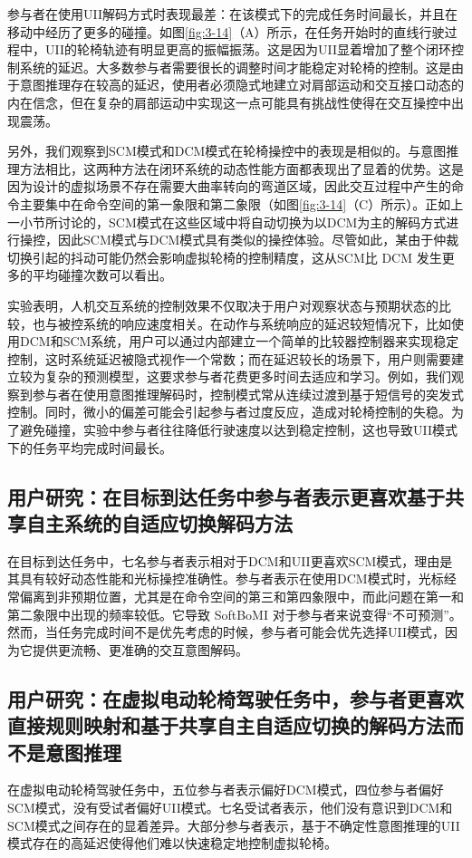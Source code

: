 参与者在使用UII解码方式时表现最差：在该模式下的完成任务时间最长，并且在移动中经历了更多的碰撞。如图\ref{fig:3-14}（A）所示，在任务开始时的直线行驶过程中，UII的轮椅轨迹有明显更高的振幅振荡。这是因为UII显着增加了整个闭环控制系统的延迟。大多数参与者需要很长的调整时间才能稳定对轮椅的控制。这是由于意图推理存在较高的延迟，使用者必须隐式地建立对肩部运动和交互接口动态的内在信念，但在复杂的肩部运动中实现这一点可能具有挑战性使得在交互操控中出现震荡。  

另外，我们观察到SCM模式和DCM模式在轮椅操控中的表现是相似的。与意图推理方法相比，这两种方法在闭环系统的动态性能方面都表现出了显着的优势。这是因为设计的虚拟场景不存在需要大曲率转向的弯道区域，因此交互过程中产生的命令主要集中在命令空间的第一象限和第二象限（如图\ref{fig:3-14}（C）所示）。正如上一小节所讨论的，SCM模式在这些区域中将自动切换为以DCM为主的解码方式进行操控，因此SCM模式与DCM模式具有类似的操控体验。尽管如此，某由于仲裁切换引起的抖动可能仍然会影响虚拟轮椅的控制精度，这从SCM比 DCM 发生更多的平均碰撞次数可以看出。  

实验表明，人机交互系统的控制效果不仅取决于用户对观察状态与预期状态的比较，也与被控系统的响应速度相关。在动作与系统响应的延迟较短情况下，比如使用DCM和SCM系统，用户可以通过内部建立一个简单的比较器控制器来实现稳定控制，这时系统延迟被隐式视作一个常数；而在延迟较长的场景下，用户则需要建立较为复杂的预测模型，这要求参与者花费更多时间去适应和学习。例如，我们观察到参与者在使用意图推理解码时，控制模式常从连续过渡到基于短信号的突发式控制。同时，微小的偏差可能会引起参与者过度反应，造成对轮椅控制的失稳。为了避免碰撞，实验中参与者往往降低行驶速度以达到稳定控制，这也导致UII模式下的任务平均完成时间最长。

\subsection{用户研究：在目标到达任务中参与者表示更喜欢基于共享自主系统的自适应切换解码方法}在目标到达任务中，七名参与者表示相对于DCM和UII更喜欢SCM模式，理由是其具有较好动态性能和光标操控准确性。参与者表示在使用DCM模式时，光标经常偏离到非预期位置，尤其是在命令空间的第三和第四象限中，而此问题在第一和第二象限中出现的频率较低。它导致 SoftBoMI 对于参与者来说变得``不可预测''。然而，当任务完成时间不是优先考虑的时候，参与者可能会优先选择UII模式，因为它提供更流畅、更准确的交互意图解码。  

\subsection{用户研究：在虚拟电动轮椅驾驶任务中，参与者更喜欢直接规则映射和基于共享自主自适应切换的解码方法而不是意图推理}在虚拟电动轮椅驾驶任务中，五位参与者表示偏好DCM模式，四位参与者偏好SCM模式，没有受试者偏好UII模式。七名受试者表示，他们没有意识到DCM和SCM模式之间存在的显着差异。大部分参与者表示，基于不确定性意图推理的UII模式存在的高延迟使得他们难以快速稳定地控制虚拟轮椅。

